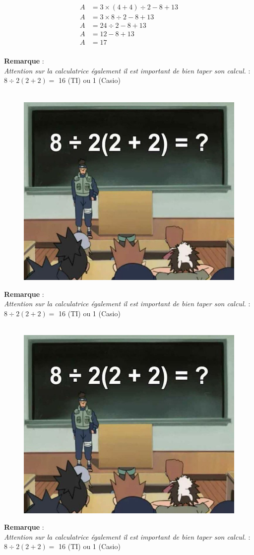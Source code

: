 \begin{align*}
  A &= 3 \times (4 + 4) \div 2 - 8 + 13 \\
  A &= 3 \times 8 \div 2 - 8 + 13\\
  A &= 24 \div 2 - 8 + 13 \\
  A &= 12 - 8  + 13\\
  A &= 17 \\
\end{align*}


\textbf{Remarque} : \\
\textit{Attention sur la calculatrice également il est important de bien taper son calcul. } : $8 \div 2(2+2) =$ 16 (TI) ou 1 (Casio)

\begin{figure}[H]
      \centering
      \includegraphics[width=0.4\linewidth]{5x1-calculer/naruto.png}
\end{figure}


\newpage

\textbf{Remarque} : \\
\textit{Attention sur la calculatrice également il est important de bien taper son calcul. } : $8 \div 2(2+2) =$ 16 (TI) ou 1 (Casio)


  \begin{figure}[H]
        \centering
        \includegraphics[width=0.4\linewidth]{5x1-calculer/naruto.png}
  \end{figure}




\textbf{Remarque} : \\
\textit{Attention sur la calculatrice également il est important de bien taper son calcul. } : $8 \div 2(2+2) =$ 16 (TI) ou 1 (Casio)

